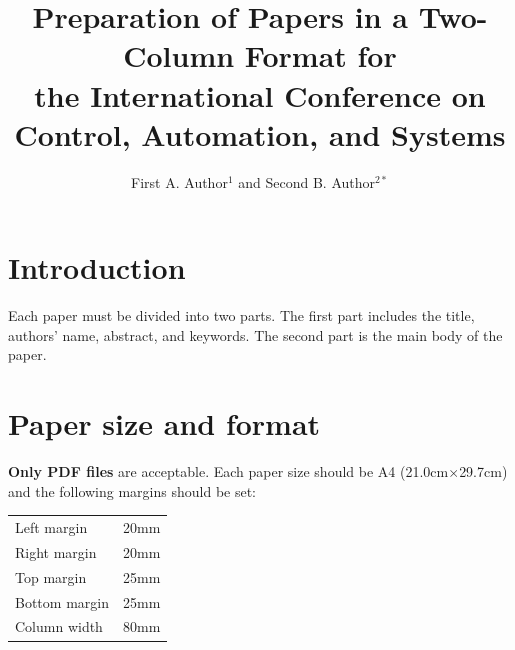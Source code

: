 \documentclass[10pt,twocolumn]{ICCAS}
\begin{document}
\title{Preparation of Papers in a Two-Column Format for\\ the International Conference on Control, Automation, and Systems}

\author{First A. Author${}^{1}$ and Second B. Author${}^{2*}$ }





\maketitle


\section{Introduction}
Each paper must be divided into two parts. The first part includes the title, authors' name, abstract, and keywords. The second part is the main body of the paper.

\section{Paper size and format}
\textbf{Only PDF files} are acceptable. Each paper size should be
A4 (21.0cm$\times$29.7cm) and the following margins should be set:

\begin{center}
\begin{tabular}{lc}
    Left margin  &  20mm \\
    Right margin &  20mm \\
    Top margin   &  25mm \\
    Bottom margin&  25mm \\
    Column width &  80mm \\
\end{tabular}
\end{center}
\end{document}
